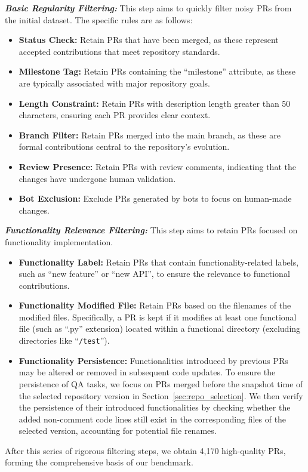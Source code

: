 \textbf{\textit{Basic Regularity Filtering:}} This step aims to quickly filter noisy PRs from the initial dataset. The specific rules are as follows:
\begin{itemize}[leftmargin=*]
    \item \textbf{Status Check:} Retain PRs that have been merged, as these represent accepted contributions that meet repository standards.
    \item \textbf{Milestone Tag:} Retain PRs containing the ``milestone'' attribute, as these are typically associated with major repository goals.
    \item \textbf{Length Constraint:} Retain PRs with description length greater than 50 characters, ensuring each PR provides clear context.
    \item \textbf{Branch Filter:} Retain PRs merged into the main branch, as these are formal contributions central to the repository's evolution.
    \item \textbf{Review Presence:} Retain PRs with review comments, indicating that the changes have undergone human validation.
    \item \textbf{Bot Exclusion:} Exclude PRs generated by bots to focus on human-made changes.
    
\end{itemize}

\textbf{\textit{Functionality Relevance Filtering:}}
This step aims to retain PRs focused on functionality implementation. 

\begin{itemize}[leftmargin=*]

    \item \textbf{Functionality Label:} Retain PRs that contain functionality-related labels, such as ``new feature'' or ``new API'', to ensure the relevance to functional contributions.
    \item \textbf{Functionality Modified File:} Retain PRs based on the filenames of the modified files. Specifically, a PR is kept if it modifies at least one functional file (such as ``.py'' extension) located within a functional directory (excluding directories like ``\texttt{/test}'').
    \item \textbf{Functionality Persistence:} Functionalities introduced by previous PRs may be altered or removed in subsequent code updates. To ensure the persistence of QA tasks, we focus on PRs merged before the snapshot time of the selected repository version in Section~\ref{sec:repo_selection}. We then verify the persistence of their introduced functionalities by checking whether the added non-comment code lines still exist in the corresponding files of the selected version, accounting for potential file renames.


\end{itemize}
After this series of rigorous filtering steps, we obtain 4,170 high-quality PRs, forming the comprehensive basis of our benchmark.

